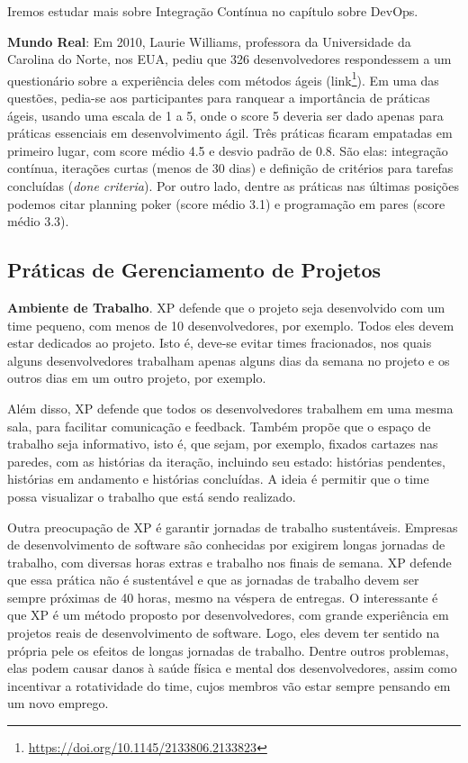 \documentclass[
  11pt,
  twoside]{book}
\DeclareRobustCommand{\href}[2]{#2\footnote{\url{#1}}}
\newenvironment{esmbox}{\centering \vspace{1.5ex} \begin{tcolorbox}[breakable, colback=backcolor, width=4.9in]}{\end{tcolorbox} \vspace{1.5ex}}
\begin{document}
Iremos estudar mais sobre Integração Contínua no capítulo sobre DevOps.

\begin{esmbox}

\textbf{Mundo Real}: Em 2010, Laurie Williams, professora da
Universidade da Carolina do Norte, nos EUA, pediu que 326
desenvolvedores respondessem a um questionário sobre a experiência deles
com métodos ágeis
(\href{https://doi.org/10.1145/2133806.2133823}{link}). Em uma das
questões, pedia-se aos participantes para ranquear a importância de
práticas ágeis, usando uma escala de 1 a 5, onde o score 5 deveria ser
dado apenas para práticas essenciais em desenvolvimento ágil. Três
práticas ficaram empatadas em primeiro lugar, com score médio 4.5 e
desvio padrão de 0.8. São elas: integração contínua, iterações curtas
(menos de 30 dias) e definição de critérios para tarefas concluídas
(\emph{done criteria}). Por outro lado, dentre as práticas nas últimas
posições podemos citar planning poker (score médio 3.1) e programação em
pares (score médio 3.3).

\end{esmbox}

\hypertarget{pruxe1ticas-de-gerenciamento-de-projetos}{%
\subsection{Práticas de Gerenciamento de
Projetos}\label{pruxe1ticas-de-gerenciamento-de-projetos}}

 \textbf{Ambiente de
Trabalho}. XP defende que o projeto seja desenvolvido com um time
pequeno, com menos de 10 desenvolvedores, por exemplo. Todos eles devem
estar dedicados ao projeto. Isto é, deve-se evitar times fracionados,
nos quais alguns desenvolvedores trabalham apenas alguns dias da semana
no projeto e os outros dias em um outro projeto, por exemplo.

Além disso, XP defende que todos os desenvolvedores trabalhem em uma
mesma sala, para facilitar comunicação e feedback. Também propõe que o
espaço de trabalho seja informativo, isto é, que sejam, por exemplo,
fixados cartazes nas paredes, com as histórias da iteração, incluindo
seu estado: histórias pendentes, histórias em andamento e histórias
concluídas. A ideia é permitir que o time possa visualizar o trabalho
que está sendo realizado.

Outra preocupação de XP é garantir jornadas de trabalho sustentáveis.
Empresas de desenvolvimento de software são conhecidas por exigirem
longas jornadas de trabalho, com diversas horas extras e trabalho nos
finais de semana. XP defende que essa prática não é sustentável e que as
jornadas de trabalho devem ser sempre próximas de 40 horas, mesmo na
véspera de entregas. O interessante é que XP é um método proposto por
desenvolvedores, com grande experiência em projetos reais de
desenvolvimento de software. Logo, eles devem ter sentido na própria
pele os efeitos de longas jornadas de trabalho. Dentre outros problemas,
elas podem causar danos à saúde física e mental dos desenvolvedores,
assim como incentivar a rotatividade do time, cujos membros vão estar
sempre pensando em um novo emprego.
\end{document}
